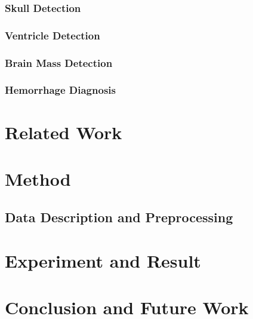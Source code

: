 \documentclass [11pt, proquest] {uwthesis}[2020/02/24]
\begin{document}
\subsection{Skull Detection}


\subsection{Ventricle Detection}


\subsection{Brain Mass Detection}



\subsection{Hemorrhage Diagnosis}





\chapter {Related Work}






\chapter {Method}

\section{Data Description and Preprocessing}







\chapter {Experiment and Result}





\chapter {Conclusion and Future Work}
\end{document}
